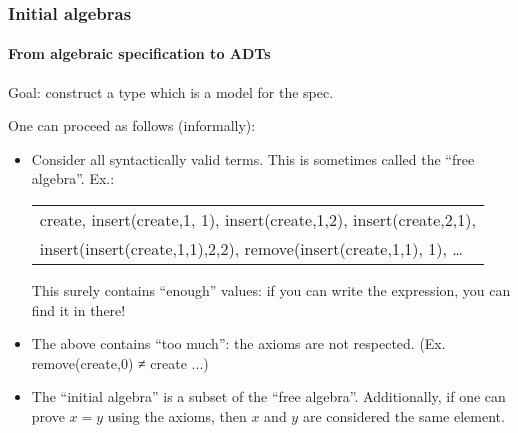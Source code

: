 \documentclass{beamer}
\begin{document}
\begin{frame}[fragile]
\frametitle{Initial algebras}
\framesubtitle{From algebraic specification to ADTs}
Goal: construct a type which is a model for the spec.
\bigskip

One can proceed as follows (informally):
\begin{itemize}
\item Consider all syntactically valid terms. This is sometimes
called the ``free algebra''.
Ex.:
\\
\hspace*{0.5cm}
{\small\em
\begin{tabular}{l}
create, insert(create,1, 1), 
insert(create,1,2), insert(create,2,1),\\
insert(insert(create,1,1),2,2), remove(insert(create,1,1), 1), \ldots
\end{tabular}
}
This surely contains ``enough'' values: if you can write the expression, you
can find it in there!

\item The above contains ``too much'': the axioms are not respected.
(Ex. remove(create,0) ≠ create ...) 

\item The ``initial algebra'' is a subset of the ``free algebra''.
  Additionally, if one can prove $x=y$ using the axioms, then $x$ and $y$ are
  considered the same element.
\end{itemize}
\end{frame}

\end{document}
